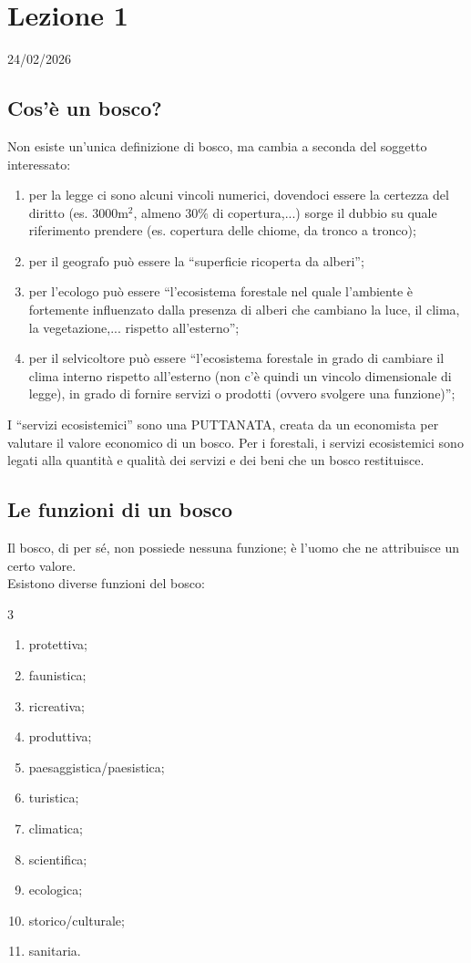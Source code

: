 \section{Lezione 1} \hfill 24/02/2026
\subsection{Cos'è un bosco?}
Non esiste un'unica definizione di bosco, ma cambia a seconda del soggetto interessato:
\begin{enumerate}[nosep]
    \item per la legge ci sono alcuni vincoli numerici, dovendoci essere la certezza del diritto (es. 3000$\text{m}^2$, almeno $30\%$ di copertura,...) \textrightarrow{} sorge il dubbio su quale riferimento prendere (es. copertura delle chiome, da tronco a tronco);
    \item per il geografo può essere la ``superficie ricoperta da alberi'';
    \item per l'ecologo può essere ``l'ecosistema forestale nel quale l'ambiente è fortemente influenzato dalla presenza di alberi che cambiano la luce, il clima, la vegetazione,... rispetto all'esterno'';
    \item per il selvicoltore può essere ``l'ecosistema forestale in grado di cambiare il clima interno rispetto all'esterno (non c'è quindi un vincolo dimensionale di legge), in grado di fornire servizi o prodotti (ovvero svolgere una funzione)'';
\end{enumerate}
I ``servizi ecosistemici'' sono una PUTTANATA, creata da un economista per valutare il valore economico di un bosco. Per i forestali, i servizi ecosistemici sono legati alla quantità e qualità dei servizi e dei beni che un bosco restituisce.
\subsection{Le funzioni di un bosco}
Il bosco, di per sé, non possiede nessuna funzione; è l'uomo che ne attribuisce un certo valore.\\
Esistono diverse funzioni del bosco:
\begin{multicols}{3}
\begin{enumerate}[nosep]
    \item protettiva;
    \item faunistica;
    \item ricreativa;
    \item produttiva;
    \item paesaggistica/paesistica;
    \item turistica;
    \item climatica;
    \item scientifica;
    \item ecologica;
    \item storico/culturale;
    \item sanitaria.
\end{enumerate}
\end{multicols}
